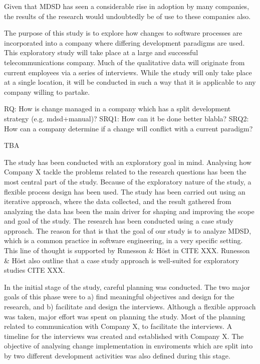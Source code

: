 \documentclass[times, 10pt,twocolumn]{Article}
\begin{document}
Given that MDSD has seen a considerable rise in adoption by many companies\cite{millermda}, the results of the research would undoubtedly be of use to these companies also.

The purpose of this study is to explore how changes to software processes are incorporated into a company where differing development paradigms are used. This exploratory study will take place at a large and successful telecommunications company. Much of the qualitative data will originate from current employees via a series of interviews. While the study will only take place at a single location, it will be conducted in such a way that it is applicable to any company willing to partake. 

RQ: How is change managed in a company which has a split development strategy (e.g. mdsd+manual)?
SRQ1: How can it be done better blabla?
SRQ2: How can a company determine if a change will conflict with a current paradigm?

TBA
\newpage



The study has been conducted with an exploratory goal in mind. Analysing how Company X tackle the problems related to the research questions has been the most central part of the study. Because of the exploratory nature of the study, a flexible process design has been used. The study has been carried out using an iterative approach, where the data collected, and the result gathered from analyzing the data has been the main driver for shaping and improving the scope and goal of the study. The research has been conducted using a case study approach. The reason for that is that the goal of our study is to analyze MDSD, which is a common practice in software engineering, in a very specific setting. This line of thought is supported by Runesson \& Höst in CITE XXX. Runesson \& Höst also outline that a case study approach is well-suited for exploratory studies CITE XXX. 

In the initial stage of the study, careful planning was conducted. The two major goals of this phase were to a) find meaningful objectives and design for the research, and b) facilitate and design the interviews. Although a flexible approach was taken, major effort was spent on planning the study. Most of the planning related to communication with Company X, to facilitate the interviews. A timeline for the interviews was created and established with Company X. The objective of analysing change implementation in enviroments which are split into by two different development activities was also defined during this stage. 
\end{document}
